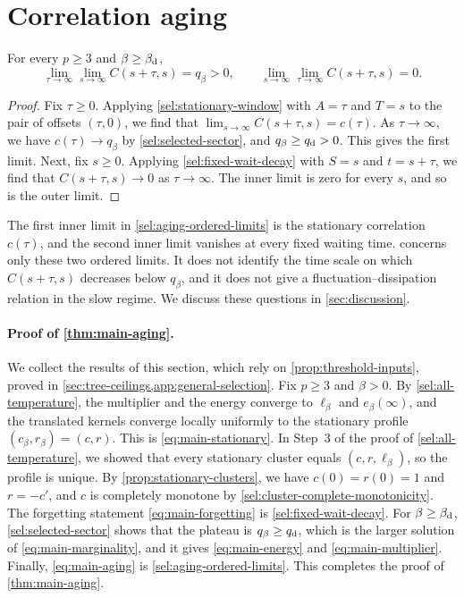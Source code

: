 \section{Correlation aging}\label{sec:aging}

\begin{corollary}\label{sel:aging}
For every $p\ge3$ and $\beta\ge\beta_{\mathrm d}$,
\begin{equation}
 \lim_{\tau\to\infty}\lim_{s\to\infty}C(s+\tau,s)=q_\beta>0,
 \qquad
 \lim_{s\to\infty}\lim_{\tau\to\infty}C(s+\tau,s)=0.
 \label{sel:aging-ordered-limits}
\end{equation}
\end{corollary}

\begin{proof}
Fix $\tau\ge0$. Applying \eqref{sel:stationary-window} with $A=\tau$ and $T=s$ to the pair of offsets $(\tau,0)$, we find that $\lim_{s\to\infty}C(s+\tau,s)=c(\tau)$. As $\tau\to\infty$, we have $c(\tau)\to q_\beta$ by \cref{sel:selected-sector}, and $q_\beta\ge q_{\mathrm d}>0$. This gives the first limit. Next, fix $s\ge0$. Applying \eqref{sel:fixed-wait-decay} with $S=s$ and $t=s+\tau$, we find that $C(s+\tau,s)\to0$ as $\tau\to\infty$. The inner limit is zero for every $s$, and so is the outer limit.
\end{proof}

The first inner limit in \eqref{sel:aging-ordered-limits} is the stationary correlation $c(\tau)$, and the second inner limit vanishes at every fixed waiting time.  concerns only these two ordered limits. It does not identify the time scale on which $C(s+\tau,s)$ decreases below $q_\beta$, and it does not give a fluctuation--dissipation relation in the slow regime. We discuss these questions in \cref{sec:discussion}.

\paragraph{Proof of \cref{thm:main-aging}.}
We collect the results of this section, which rely on \cref{prop:threshold-inputs}, proved in \cref{sec:tree-ceilings,app:general-selection}. Fix $p\ge3$ and $\beta>0$. By \cref{sel:all-temperature}, the multiplier and the energy converge to $\ell_\beta$ and $e_\beta(\infty)$, and the translated kernels converge locally uniformly to the stationary profile $(c_\beta,r_\beta)=(c,r)$. This is \eqref{eq:main-stationary}. In Step~3 of the proof of \cref{sel:all-temperature}, we showed that every stationary cluster equals $(c,r,\ell_\beta)$, so the profile is unique. By \cref{prop:stationary-clusters}, we have $c(0)=r(0)=1$ and $r=-c'$, and $c$ is completely monotone by \cref{sel:cluster-complete-monotonicity}. The forgetting statement \eqref{eq:main-forgetting} is \eqref{sel:fixed-wait-decay}. For $\beta\ge\beta_{\mathrm d}$, \cref{sel:selected-sector} shows that the plateau is $q_\beta\ge q_{\mathrm d}$, which is the larger solution of \eqref{eq:main-marginality}, and it gives \eqref{eq:main-energy} and \eqref{eq:main-multiplier}. Finally, \eqref{eq:main-aging} is \eqref{sel:aging-ordered-limits}. This completes the proof of \cref{thm:main-aging}.
